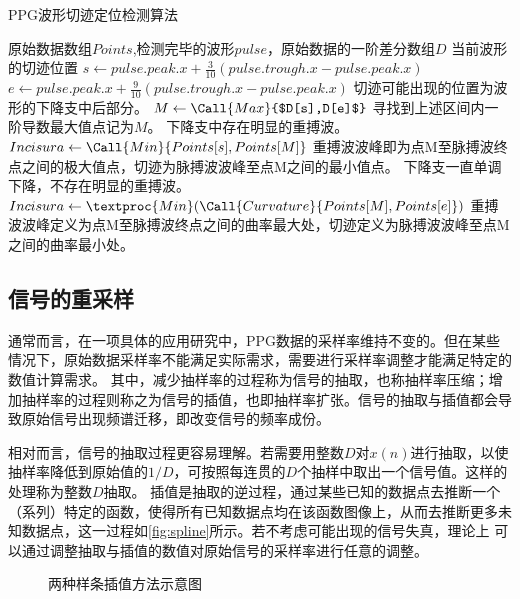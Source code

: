 \begin{breakablealgorithm}
    \caption{PPG波形切迹定位检测算法}
    \label{alg:incisuras_detect}
    \begin{algorithmic}[1] %
        \Require 原始数据数组$Points$,检测完毕的波形$pulse$，原始数据的一阶差分数组$D$
        \Ensure 当前波形的切迹位置
            \State $s \gets pulse.peak.x + \frac{3}{10}(pulse.trough.x-pulse.peak.x)$
            \State $e \gets pulse.peak.x + \frac{9}{10}(pulse.trough.x-pulse.peak.x)$
            \State \Comment 切迹可能出现的位置为波形的下降支中后部分。
            \State $M  \gets \Call{Max}{$D[s],D[e]$}$
            \State \Comment 寻找到上述区间内一阶导数最大值点记为$M$。
                \State \Comment 下降支中存在明显的重搏波。
                \State $Incisura \gets \Call{Min}{Points[s],Points[M]}$
                \State \Comment 重搏波波峰即为点M至脉搏波终点之间的极大值点，切迹为脉搏波波峰至点M之间的最小值点。
            \Else
                \State \Comment 下降支一直单调下降，不存在明显的重搏波。
                \State $Incisura \gets \textproc{Min}({\Call{Curvature}{Points[M],Points[e]}})$
                \State \Comment 重搏波波峰定义为点M至脉搏波终点之间的曲率最大处，切迹定义为脉搏波波峰至点M之间的曲率最小处。
            \EndIf
            \State {}
        \EndFunction
    \end{algorithmic}
\end{breakablealgorithm}

\subsection{信号的重采样}
通常而言，在一项具体的应用研究中，PPG数据的采样率维持不变的。但在某些情况下，原始数据采样率不能满足实际需求，需要进行采样率调整才能满足特定的数值计算需求。
其中，减少抽样率的过程称为信号的抽取，也称抽样率压缩；增加抽样率的过程则称之为信号的插值，也即抽样率扩张\cite{Cheng2008}。信号的抽取与插值都会导致原始信号出现频谱迁移，即改变信号的频率成份\cite{Cheng2008}。

相对而言，信号的抽取过程更容易理解。若需要用整数$D$对$x(n)$进行抽取，以使抽样率降低到原始值的$1/D$，可按照每连贯的$D$个抽样中取出一个信号值。这样的处理称为整数$D$抽取\cite{Cheng2008}。
插值是抽取的逆过程，通过某些已知的数据点去推断一个（系列）特定的函数，使得所有已知数据点均在该函数图像上，从而去推断更多未知数据点，这一过程如\autoref{fig:spline}所示。若不考虑可能出现的信号失真，理论上
可以通过调整抽取与插值的数值对原始信号的采样率进行任意的调整。
\begin{figure}[htbp]
    \centering
    \quad
    \caption{\label{fig:spline}两种样条插值方法示意图}
\end{figure}

